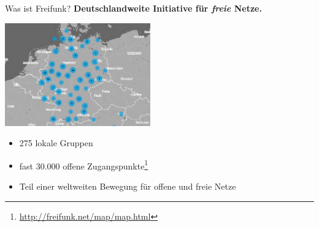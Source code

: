 \documentclass[10pt]{beamer}
\begin{document}
    \begin{frame}{Was ist Freifunk?}
      \large \textbf{Deutschlandweite Initiative für \emph{freie} Netze.}
      \pause
      \begin{center}
        \includegraphics[height=12em]{images/2016-02-17_map-de}
      \end{center}
      \begin{itemize}
        \item 275 lokale Gruppen
        \item fast 30.000 offene Zugangspunkte\footnote{\url{http://freifunk.net/map/map.html}}
        \item Teil einer weltweiten Bewegung für offene und freie Netze
      \end{itemize}
    \end{frame}
\end{document}
